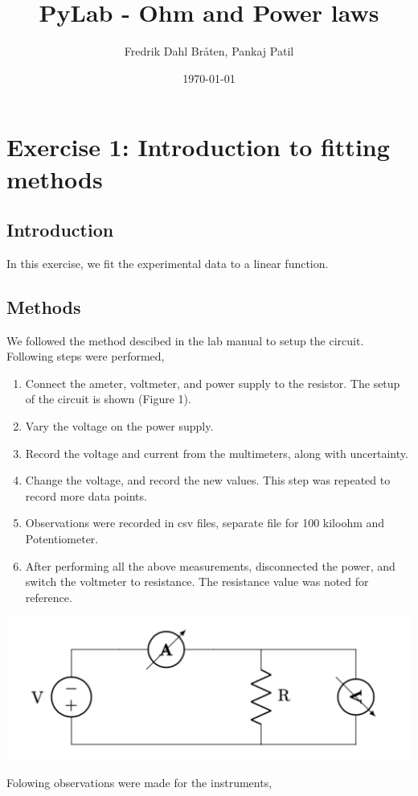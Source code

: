 \documentclass[letterpaper,12pt]{article}
\begin{document}
\title{PyLab - Ohm and Power laws}
\author{Fredrik Dahl Bråten, Pankaj Patil}
\date{\today}
\maketitle

\section{Exercise 1:  Introduction to fitting methods}

\subsection{Introduction}

In this exercise, we fit the experimental data to a linear function.  

\subsection{Methods}

We followed the method descibed in the lab manual to setup the circuit. Following steps were 
performed,

\begin{enumerate}
  \item Connect the ameter, voltmeter, and power supply to the resistor. The setup of the circuit is shown (Figure 1).
  \item Vary the voltage on the power supply.
  \item Record the voltage and current from the multimeters, along with uncertainty.
  \item Change the voltage, and record the new values. This step was repeated to record more data  points.
  \item Observations were recorded in csv files, separate file for 100 kiloohm and Potentiometer.
  \item After performing all the above measurements, disconnected the power, and switch the voltmeter to resistance. The resistance value was noted for reference.
\end{enumerate}

\begin{center}
  \includegraphics[width=1.0\linewidth]{../lab_1_ex_1_setup.png}    
\end{center}
Folowing observations were made for the instruments,
\end{document}
